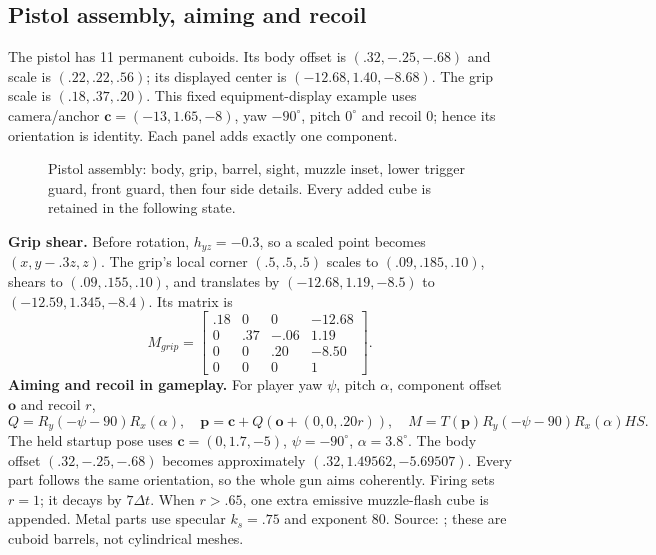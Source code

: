 \subsection{Pistol assembly, aiming and recoil}
The pistol has 11 permanent cuboids. Its body offset is $(.32,-.25,-.68)$ and scale is $(.22,.22,.56)$; its displayed center is $(-12.68,1.40,-8.68)$. The grip scale is $(.18,.37,.20)$. This fixed equipment-display example uses camera/anchor $\mathbf c=(-13,1.65,-8)$, yaw $-90^\circ$, pitch $0^\circ$ and recoil 0; hence its orientation is identity. Each panel adds exactly one component.
\begin{figure}[htbp]

\caption{Pistol assembly: body, grip, barrel, sight, muzzle inset, lower trigger guard, front guard, then four side details. Every added cube is retained in the following state.}
\end{figure}

\textbf{Grip shear.} Before rotation, $h_{yz}=-0.3$, so a scaled point becomes $(x,y-.3z,z)$. The grip's local corner $(.5,.5,.5)$ scales to $(.09,.185,.10)$, shears to $(.09,.155,.10)$, and translates by $(-12.68,1.19,-8.5)$ to $(-12.59,1.345,-8.4)$. Its matrix is
\[
 M_{grip}=\begin{bmatrix}.18&0&0&-12.68\\0&.37&-.06&1.19\\0&0&.20&-8.50\\0&0&0&1\end{bmatrix}.
\]
\textbf{Aiming and recoil in gameplay.} For player yaw $\psi$, pitch $\alpha$, component offset $\mathbf o$ and recoil $r$,
\[
 Q=R_y(-\psi-90)R_x(\alpha),\quad
 \mathbf p=\mathbf c+Q(\mathbf o+(0,0,.20r)),\quad
 M=T(\mathbf p)R_y(-\psi-90)R_x(\alpha)HS.
\]
The held startup pose uses $\mathbf c=(0,1.7,-5)$, $\psi=-90^\circ$, $\alpha=3.8^\circ$. The body offset $(.32,-.25,-.68)$ becomes approximately $(.32,1.49562,-5.69507)$. Every part follows the same orientation, so the whole gun aims coherently. Firing sets $r=1$; it decays by $7\Delta t$. When $r>.65$, one extra emissive muzzle-flash cube is appended. Metal parts use specular $k_s=.75$ and exponent 80. Source: ; these are cuboid barrels, not cylindrical meshes.

